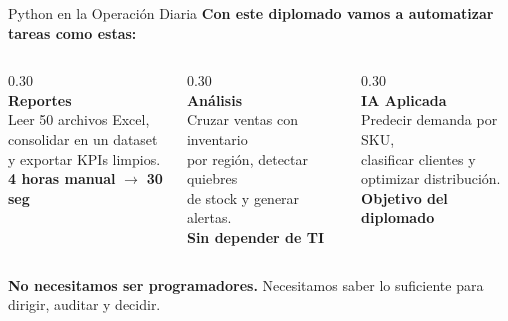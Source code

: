 \documentclass[aspectratio=169, 11pt]{beamer}
\begin{document}
\begin{frame}{Python en la Operación Diaria}
  \vspace{-2pt}
  {\small\color{arcaDark}\bfseries
    Con este diplomado vamos a automatizar tareas como estas:}

  \vspace{10pt}
  \begin{columns}[T]
    \begin{column}{0.30\textwidth}
      \centering
      {\Huge\color{arcaRed}\faFileExcel}\\[8pt]
      {\small\bfseries\color{arcaDark} Reportes}\\[4pt]
      {\scriptsize\color{textMuted}
        Leer 50 archivos Excel,\\
        consolidar en un dataset\\
        y exportar KPIs limpios.\\[4pt]
        \textbf{4 horas manual} $\rightarrow$ \textbf{30 seg}}
    \end{column}

    \begin{column}{0.30\textwidth}
      \centering
      {\Huge\color{arcaRed}\faChartBar}\\[8pt]
      {\small\bfseries\color{arcaDark} Análisis}\\[4pt]
      {\scriptsize\color{textMuted}
        Cruzar ventas con inventario\\
        por región, detectar quiebres\\
        de stock y generar alertas.\\[4pt]
        \textbf{Sin depender de TI}}
    \end{column}

    \begin{column}{0.30\textwidth}
      \centering
      {\Huge\color{arcaRed}\faRobot}\\[8pt]
      {\small\bfseries\color{arcaDark} IA Aplicada}\\[4pt]
      {\scriptsize\color{textMuted}
        Predecir demanda por SKU,\\
        clasificar clientes y\\
        optimizar distribución.\\[4pt]
        \textbf{Objetivo del diplomado}}
    \end{column}
  \end{columns}

  \vspace{14pt}
  \centering
  {\footnotesize\color{arcaDark}
    \textbf{No necesitamos ser programadores.}
    Necesitamos saber lo suficiente para dirigir, auditar y decidir.}
\end{frame}
\end{document}
